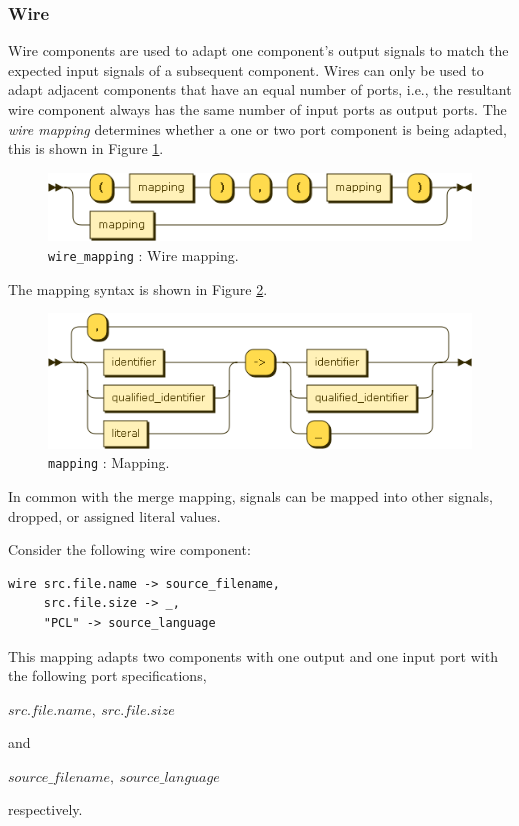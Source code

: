 \subsubsection{Wire}\label{subsubsec:wire}
Wire components are used to adapt one component's output signals to match the expected input signals of a subsequent component. Wires can only be used to adapt adjacent components that have an equal number of ports, i.e., the resultant wire component always has the same number of input ports as output ports. The \emph{wire mapping} determines whether a one or two port component is being adapted, this is shown in Figure \ref{fig:pcl-wire-mapping}.
\begin{figure}[h!]
  \centering
    \includegraphics[scale=\DiagramScale]{chapters/compiler/diagrams/wire_mapping}
  \caption{\texttt{wire\_mapping} : Wire mapping.}
  \label{fig:pcl-wire-mapping}
\end{figure}
The mapping syntax is shown in Figure \ref{fig:pcl-mapping}.
\begin{figure}[h!]
  \centering
    \includegraphics[scale=\DiagramScale]{chapters/compiler/diagrams/mapping}
  \caption{\texttt{mapping} : Mapping.}
  \label{fig:pcl-mapping}
\end{figure}
In common with the merge mapping, signals can be mapped into other signals, dropped, or assigned literal values.

Consider the following wire component:
\begin{center}
  \begin{verbatim}
wire src.file.name -> source_filename,
     src.file.size -> _,
     "PCL" -> source_language
  \end{verbatim}
\end{center}
This mapping adapts two components with one output and one input port with the following port specifications,
\begin{center}
$src.file.name,\ src.file.size$
\end{center}
and
\begin{center}
$source\_filename,\ source\_language$
\end{center}
respectively.

